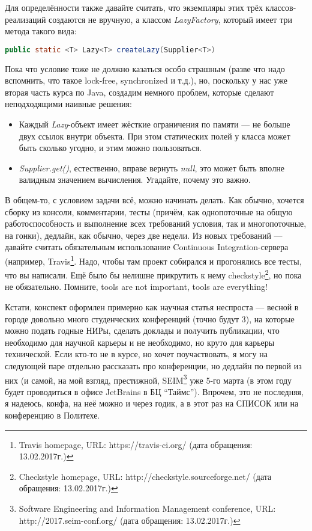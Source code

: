 \documentclass[a5paper]{article}
\begin{document}
Для определённости также давайте считать, что экземпляры этих трёх классов-реализаций создаются не вручную, а классом \textit{LazyFactory}, который имеет три метода такого вида:
\begin{lstlisting}[language=Java]
public static <T> Lazy<T> createLazy(Supplier<T>)
\end{lstlisting}

Пока что условие тоже не должно казаться особо страшным (разве что надо вспомнить, что такое lock-free, synchronized и т.д.), но, поскольку у нас уже вторая часть курса по Java, создадим немного проблем, которые сделают неподходящими наивные решения:
\begin{itemize}
	\item Каждый \textit{Lazy}-объект имеет жёсткие ограничения по памяти --- не больше двух ссылок внутри объекта. При этом статических полей у класса может быть сколько угодно, и этим можно пользоваться.
	\item \textit{Supplier.get()}, естественно, вправе вернуть \textit{null}, это может быть вполне валидным значением вычисления. Угадайте, почему это важно.
\end{itemize}

В общем-то, с условием задачи всё, можно начинать делать. Как обычно, хочется сборку из консоли, комментарии, тесты (причём, как однопоточные на общую работоспособность и выполнение всех требований условия, так и многопоточные, на гонки), дедлайн, как обычно, через две недели. Из новых требований --- давайте считать обязательным использование Continuous Integration-сервера (например, Travis\footnote{Travis homepage, URL: https://travis-ci.org/ (дата обращения: 13.02.2017г.)}. Надо, чтобы там проект собирался и прогонялись все тесты, что вы написали. Ещё было бы нелишне прикрутить к нему checkstyle\footnote{Checkstyle homepage, URL: http://checkstyle.sourceforge.net/ (дата обращения: 13.02.2017г.)}, но пока не обязательно. Помните, tools are not important, tools are everything!

Кстати, конспект оформлен примерно как научная статья неспроста --- весной в городе довольно много студенческих конференций (точно будут 3), на которые можно подать годные НИРы, сделать доклады и получить публикации, что необходимо для научной карьеры и не необходимо, но круто для карьеры технической. Если кто-то не в курсе, но хочет поучаствовать, я могу на следующей паре отдельно рассказать про конференции, но дедлайн по первой из них (и самой, на мой взгляд, престижной, SEIM\footnote{Software Engineering and Information Management conference, URL: http://2017.seim-conf.org/ (дата обращения: 13.02.2017г.)} уже 5-го марта (в этом году будет проводиться в офисе JetBrains в БЦ ``Таймс''). Впрочем, это не последняя, я надеюсь, конфа, на неё можно и через годик, а в этот раз на СПИСОК или на конференцию в Политехе.
\end{document}
